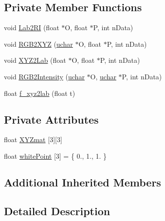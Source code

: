 \subsection*{Private Member Functions}
\begin{DoxyCompactItemize}
\item 
void \hyperlink{class_vision_1_1_conversion_adf3ad076d44a9986332f5078c5fa2cc7}{Lab2\+R\+I} (float $\ast$O, float $\ast$P, int n\+Data)
\item 
void \hyperlink{class_vision_1_1_conversion_afe7b24da82f77ff1116f8bc3d0a62fcc}{R\+G\+B2\+X\+Y\+Z} (\hyperlink{_soil_math_types_8h_a65f85814a8290f9797005d3b28e7e5fc}{uchar} $\ast$O, float $\ast$P, int n\+Data)
\item 
void \hyperlink{class_vision_1_1_conversion_a9ecc41c4226eafc55d0ee0cc550e593b}{X\+Y\+Z2\+Lab} (float $\ast$O, float $\ast$P, int n\+Data)
\item 
void \hyperlink{class_vision_1_1_conversion_a93626e56872b99ed79fd3540c6adf776}{R\+G\+B2\+Intensity} (\hyperlink{_soil_math_types_8h_a65f85814a8290f9797005d3b28e7e5fc}{uchar} $\ast$O, \hyperlink{_soil_math_types_8h_a65f85814a8290f9797005d3b28e7e5fc}{uchar} $\ast$P, int n\+Data)
\item 
float \hyperlink{class_vision_1_1_conversion_aea73f90915cd0459dcaf70fb3e109a82}{f\+\_\+xyz2lab} (float t)
\end{DoxyCompactItemize}
\subsection*{Private Attributes}
\begin{DoxyCompactItemize}
\item 
float \hyperlink{class_vision_1_1_conversion_ad0c6e6c63380927c63da7f967b5e61d1}{X\+Y\+Zmat} \mbox{[}3\mbox{]}\mbox{[}3\mbox{]}
\item 
float \hyperlink{class_vision_1_1_conversion_adbaed406827f7ffb583d003815a9f3f8}{white\+Point} \mbox{[}3\mbox{]} = \{ 0., 1., 1. \}
\end{DoxyCompactItemize}
\subsection*{Additional Inherited Members}


\subsection{Detailed Description}


